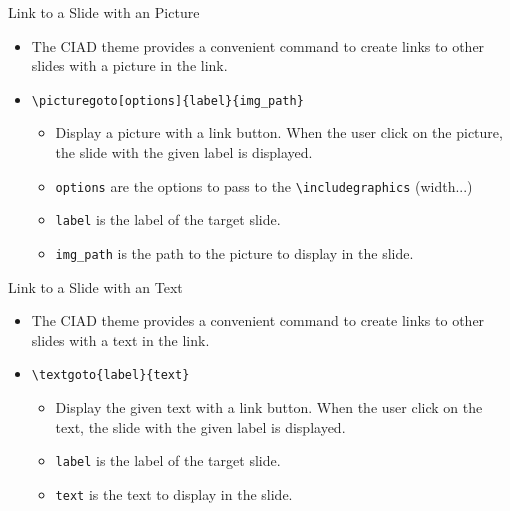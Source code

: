 \documentclass[english,sectioncirclenumberstyle]{ciadbeamer}
\begin{document}
\begin{frame}[t]{Link to a Slide with an Picture}
	\begin{itemize}
	\item The CIAD theme provides a convenient command to create links to other slides with a picture in the link.
	\item \texttt{{\textbackslash}picturegoto[options]\{label\}\{img\_path\}}
		\begin{itemize}
		\item Display a picture with a link button. When the user click on the picture, the slide with the given label is displayed.
		\item \texttt{options} are the options to pass to the \texttt{{\textbackslash}includegraphics} (width...)
		\item \texttt{label} is the label of the target slide.
		\item \texttt{img\_path} is the path to the picture to display in the slide.
		\end{itemize}
	\end{itemize}
	\begin{center}
	\end{center}
\end{frame}

\begin{frame}{Link to a Slide with an Text}
	\begin{itemize}
	\item The CIAD theme provides a convenient command to create links to other slides with a text in the link.
	\item \texttt{{\textbackslash}textgoto\{label\}\{text\}}
		\begin{itemize}
		\item Display the given text with a link button. When the user click on the text, the slide with the given label is displayed.
		\item \texttt{label} is the label of the target slide.
		\item \texttt{text} is the text to display in the slide.
		\end{itemize}
	\end{itemize}
	\begin{center}
	\end{center}
\end{frame}
\end{document}
